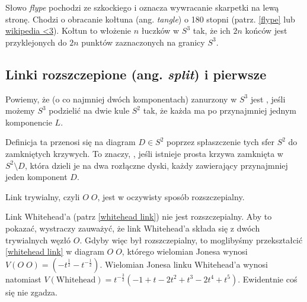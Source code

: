 \documentclass{article}
\begin{document}
Słowo \emph{flype} pochodzi ze szkockiego i oznacza wywracanie skarpetki na lewą stronę. Chodzi o obracanie kołtuna (ang. \emph{tangle}) o 180 stopni (patrz. \cref{flype} lub \href{https://en.wikipedia.org/wiki/Flype}{wikipedia <3}). Kołtun to włożenie $n$ łuczków w $S^3$ tak, że ich $2n$ końców jest przyklejonych do $2n$ punktów zaznaczonych na granicy $S^3$.

\subsection{Linki rozszczepione (ang. \emph{split}) i pierwsze}

\begin{deff}
  Powiemy, że  (o co najmniej dwóch komponentach) zanurzony w $S^3$ jest , jeśli możemy $S^3$ podzielić na dwie kule $S^2$ tak, że każda ma po przynajmniej jednym komponencie $L$. 

  Definicja ta przenosi się na diagram $D\in S^2$ poprzez spłaszczenie tych sfer $S^2$ do zamkniętych krzywych. To znaczy, , jeśli istnieje prosta krzywa zamknięta w $S^2\setminus D$, która dzieli je na dwa rozłączne dyski, każdy zawierający przynajmniej jeden komponent $D$.
\end{deff}

Link trywialny, czyli $O\;O$, jest w oczywisty sposób rozszczepialny. 

Link Whitehead'a (patrz \cref{whitehead link}) nie jest rozszczepialny. Aby to pokazać, wystraczy zauważyć, że link Whitehead'a składa się z dwóch trywialnych węzłó $O$. Gdyby więc był rozszczepialny, to moglibyśmy przekształcić \cref{whitehead link} w diagram $O\;O$, którego wielomian Jonesa wynosi $V(O\;O)=(-t^{\frac{1}{2}}-t^{-\frac{1}{2}})$. Wielomian Jonesa linku Whitehead'a wynosi natomiast $V(\text{Whitehead})=t^{-\frac{3}{2}}(-1+t-2t^2+t^3-2t^4+t^5)$. Ewidentnie coś się nie zgadza.
\end{document}
